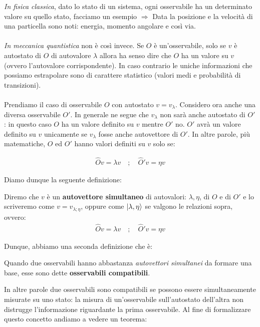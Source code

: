 	\textit{In fisica classica}, dato lo stato di un sistema, ogni osservabile ha un determinato valore su quello stato, facciamo un esempio $\Rightarrow$ Data la posizione e la velocità di una particella sono noti: energia, momento angolare e così via.
	\\
	\\
	\textit{In meccanica quantistica} non è così invece. Se $O$ è un'osservabile, solo se $v$ è autostato di $O$ di autovalore $\lambda$ allora ha senso dire che $O$ ha un valore su $v$ (ovvero l'autovalore corrispondente). In caso contrario le uniche informazioni che possiamo estrapolare sono di carattere statistico (valori medi e probabilità di transizioni).
	\\
	\\
	Prendiamo il caso di osservabile $O$ con autostato $v = v_{\lambda}$. Considero ora anche una diversa osservabile $O'$. In generale ne segue che $v_{\lambda}$ non sarà anche autostato di $O'$: in questo caso $O$ ha un valore definito su $v$ mentre $O'$ no. $O'$ avrà un valore definito su $v$ unicamente se $v_{\lambda}$ fosse anche autovettore di $O'$. In altre parole, più matematiche, $O$ ed $O'$ hanno valori definiti su $v$ solo se:
	
\begin{align*}
	\hat{O}v = \lambda v \quad ; \quad \hat{O}'v = \eta v
\end{align*}

	Diamo dunque la seguente definizione:
	
\begin{mydef}
	Diremo che $v$ è un \textbf{autovettore simultaneo} di autovalori: $\lambda, \eta$, di $O$ e di $O'$ e lo scriveremo come $v = v_{\lambda ; \eta}$, oppure come $\ket{\lambda, \eta}$ se valgono le relazioni sopra, ovvero:
\begin{align*}
	\hat{O}v = \lambda v \quad ; \quad \hat{O}'v = \eta v
\end{align*}
\end{mydef}

	Dunque, abbiamo una seconda definizione che è:

\begin{mydef}
	Quando due osservabili hanno abbastanza \textit{autovettori simultanei} da formare una base, esse sono dette \textbf{osservabili compatibili}. 
\end{mydef}	

	In altre parole due osservabili sono compatibili se possono essere simultaneamente misurate su uno stato: la misura di un'osservabile sull’autostato dell’altra non distrugge l’informazione riguardante la prima osservabile. Al fine di formalizzare questo concetto andiamo a vedere un teorema:

